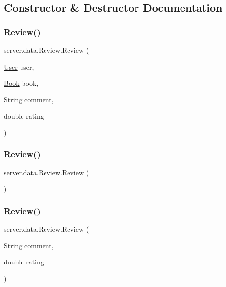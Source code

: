 \subsection{Constructor \& Destructor Documentation}
\mbox{\label{classserver_1_1data_1_1_review_a4ca7a3db27290b1a96caea6a42e96f36}} 
\subsubsection{\texorpdfstring{Review()}{Review()}\hspace{0.1cm}{\footnotesize\ttfamily [1/3]}}
{\footnotesize\ttfamily server.\+data.\+Review.\+Review (\begin{DoxyParamCaption}\item[{\hyperlink{classserver_1_1data_1_1_user}{User}}]{user,  }\item[{\hyperlink{classserver_1_1data_1_1_book}{Book}}]{book,  }\item[{String}]{comment,  }\item[{double}]{rating }\end{DoxyParamCaption})}

\mbox{\label{classserver_1_1data_1_1_review_ae9c80d66354aeacd317ad15643580d19}} 
\subsubsection{\texorpdfstring{Review()}{Review()}\hspace{0.1cm}{\footnotesize\ttfamily [2/3]}}
{\footnotesize\ttfamily server.\+data.\+Review.\+Review (\begin{DoxyParamCaption}{ }\end{DoxyParamCaption})}

\mbox{\label{classserver_1_1data_1_1_review_aacee2551f0dcde344e7a7c5d7dc8f30a}} 
\subsubsection{\texorpdfstring{Review()}{Review()}\hspace{0.1cm}{\footnotesize\ttfamily [3/3]}}
{\footnotesize\ttfamily server.\+data.\+Review.\+Review (\begin{DoxyParamCaption}\item[{String}]{comment,  }\item[{double}]{rating }\end{DoxyParamCaption})}



